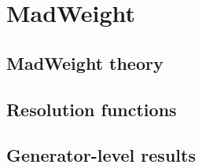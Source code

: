 \chapter{MadWeight} \label{ch::MW}

\section{MadWeight theory} \label{sec::MWTheory}

\section{Resolution functions} \label{sec::TF}

\section{Generator-level results} \label{sec::GenResults}
